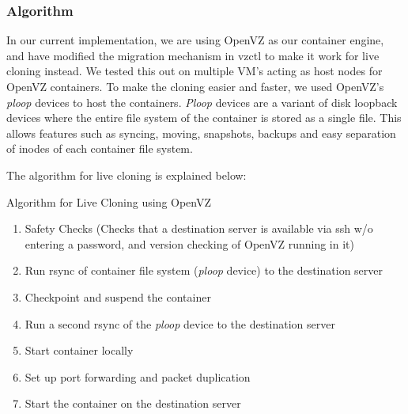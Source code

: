 

\subsubsection{Algorithm}


In our current implementation, we are using OpenVZ\cite{openvz} as our container engine, and have modified the migration mechanism in vzctl \cite{vzctl} to make it work for live cloning instead. 
We tested this out on multiple VM's acting as host nodes for OpenVZ containers. 
To make the cloning easier and faster, we used OpenVZ's \textit{ploop} devices \cite{ploop} to host the containers. 
\textit{Ploop} devices are a variant of disk loopback devices where the entire file system of the container is stored as a single file. 
This allows features such as syncing, moving, snapshots, backups and easy separation of inodes of each container file system.

The algorithm for live cloning is explained below: 

\begin{algorithm}[h]
  \caption{Algorithm for Live Cloning using OpenVZ} 
  \label{algCloning}
  \begin{enumerate}[topsep=0pt,itemsep=-1ex,partopsep=1ex,parsep=1ex]
  \item Safety Checks (Checks that a destination server is available via ssh w/o entering a password, and version checking of OpenVZ running in it) 
  \item Run rsync of container file system (\textit{ploop} device) to the destination server  
  \item Checkpoint and suspend the container 
  \item Run a second rsync of the \textit{ploop} device to the destination  server
  \item Start container locally 
  \item Set up port forwarding and packet duplication
  \item Start the container on the destination server
  \end{enumerate}

\end{algorithm}

